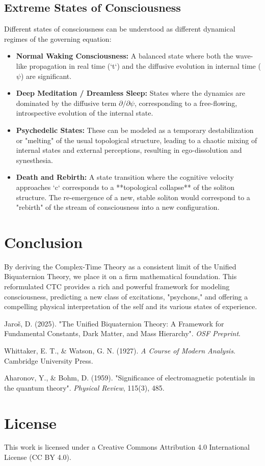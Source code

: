 \documentclass[12pt, a4paper]{article}
\begin{document}
\subsection{Extreme States of Consciousness}
Different states of consciousness can be understood as different dynamical regimes of the governing equation:
\begin{itemize}
    \item \textbf{Normal Waking Consciousness:} A balanced state where both the wave-like propagation in real time (`t`) and the diffusive evolution in internal time (\(\psi\)) are significant.
    \item \textbf{Deep Meditation / Dreamless Sleep:} States where the dynamics are dominated by the diffusive term \( \partial/\partial\psi \), corresponding to a free-flowing, introspective evolution of the internal state.
    \item \textbf{Psychedelic States:} These can be modeled as a temporary destabilization or "melting" of the usual topological structure, leading to a chaotic mixing of internal states and external perceptions, resulting in ego-dissolution and synesthesia.
    \item \textbf{Death and Rebirth:} A state transition where the cognitive velocity approaches `c` corresponds to a **topological collapse** of the soliton structure. The re-emergence of a new, stable soliton would correspond to a "rebirth" of the stream of consciousness into a new configuration.
\end{itemize}

\section{Conclusion}
By deriving the Complex-Time Theory as a consistent limit of the Unified Biquaternion Theory, we place it on a firm mathematical foundation. This reformulated CTC provides a rich and powerful framework for modeling consciousness, predicting a new class of excitations, "psychons," and offering a compelling physical interpretation of the self and its various states of experience.

\begin{thebibliography}{9}

Jaroš, D. (2025). "The Unified Biquaternion Theory: A Framework for Fundamental Constants, Dark Matter, and Mass Hierarchy". \textit{OSF Preprint}.

Whittaker, E. T., & Watson, G. N. (1927). \textit{A Course of Modern Analysis}. Cambridge University Press.

Aharonov, Y., & Bohm, D. (1959). "Significance of electromagnetic potentials in the quantum theory". \textit{Physical Review}, 115(3), 485.

\end{thebibliography}

\section*{License}
This work is licensed under a Creative Commons Attribution 4.0 International License (CC BY 4.0).
\end{document}
